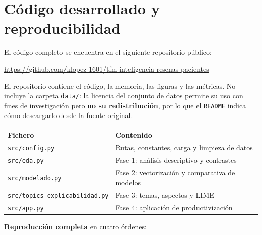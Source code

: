 \documentclass[11pt,a4paper]{article}
\begin{document}

\section{Código desarrollado y reproducibilidad}

El código completo se encuentra en el siguiente repositorio público:

\vspace{0.25cm}
\begin{center}
\url{https://github.com/klopez-1601/tfm-inteligencia-resenas-pacientes}
\end{center}
\vspace{0.25cm}

El repositorio contiene el código, la memoria, las figuras y las métricas. No
incluye la carpeta \texttt{data/}: la licencia del conjunto de datos permite su
uso con fines de investigación pero \textbf{no su redistribución}, por lo que el
\texttt{README} indica cómo descargarlo desde la fuente original.

\vspace{0.2cm}
\begin{center}\small
\begin{tabular}{@{}ll@{}}
\toprule
\textbf{Fichero} & \textbf{Contenido} \\ \midrule
\texttt{src/config.py}   & Rutas, constantes, carga y limpieza de datos \\
\texttt{src/eda.py}      & Fase 1: análisis descriptivo y contrastes \\
\texttt{src/modelado.py} & Fase 2: vectorización y comparativa de modelos \\
\texttt{src/topics\_explicabilidad.py} & Fase 3: temas, aspectos y LIME \\
\texttt{src/app.py}      & Fase 4: aplicación de productivización \\ \bottomrule
\end{tabular}
\end{center}

\textbf{Reproducción completa} en cuatro órdenes:
\end{document}
